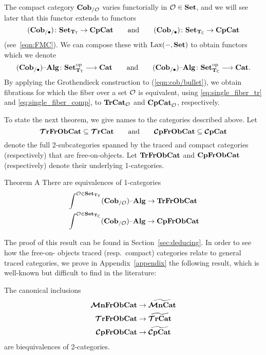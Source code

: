 \documentclass[11pt,oneside,article]{memoir}
\begin{document}
The compact category $\mathbf{Cob}_{/\mathcal{O}}$ varies functorially in $\mathcal{O}\in\mathbf{Set}$, and we will see later
that this functor extends to functors
\[
   (\mathbf{Cob}_{/\bullet})\colon\mathbf{Set}_{\mathbf{T}_{\mathsf{T}}}\to\mathbf{CpCat}\qquad\text{and}
   \qquad
   (\mathbf{Cob}_{/\bullet})\colon\mathbf{Set}_{\mathbf{T}_{\mathsf{C}}}\to\mathbf{CpCat}
\]
(see~\eqref{eqn:FMC}). We can compose these with $\operatorname{Lax}(-,\mathbf{Set})$ to obtain functors which we denote
\begin{equation}
      \label{eqn:cob/bullet}
   (\mathbf{Cob}_{/\bullet}){\text \textendash}\mathbf{Alg}\colon\mathbf{Set}_{\mathbf{T}_{\mathsf{T}}}^{\mathrm{op}}\longrightarrow\mathbf{Cat}
   \qquad\text{and}\qquad
   (\mathbf{Cob}_{/\bullet}){\text \textendash}\mathbf{Alg}\colon\mathbf{Set}_{\mathbf{T}_{\mathsf{C}}}^{\mathrm{op}}\longrightarrow\mathbf{Cat}.
\end{equation}
By applying the Grothendieck construction to (\ref{eqn:cob/bullet}), we obtain fibrations for which
the fiber over a set $\mathcal{O}$ is equivalent, using \eqref{eq:single_fiber_tr} and
\eqref{eq:single_fiber_comp}, to $\mathbf{TrCat}_{\mathcal{O}}$ and $\mathbf{CpCat}_{\mathcal{O}}$, respectively.

To state the next theorem, we give names to the categories described above. Let
\[
   \bm{\mathcal{T}}\mathbf{rFrObCat}\subseteq\bm{\mathcal{T}}\mathbf{rCat} \qquad \text{and} \qquad \bm{\mathcal{C}}\mathbf{pFrObCat}\subseteq\bm{\mathcal{C}}\mathbf{pCat}
\]
denote the full 2-subcategories spanned by the traced and compact categories (respectively) that are
free-on-objects. Let $\mathbf{TrFrObCat}$ and $\mathbf{CpFrObCat}$ (respectively) denote their underlying
1-categories.

\begin{named}{Theorem A}
      \label{thm:TheoremA_statement}
  There are equivalences of 1-categories
  \begin{align*}
     &\int^{\mathcal{O}\in\mathbf{Set}_{\mathbf{T}_{\mathsf{T}}}}(\mathbf{Cob}_{/\mathcal{O}}){\text \textendash}\mathbf{Alg} \to \mathbf{TrFrObCat}
     \\
     &\int^{\mathcal{O}\in\mathbf{Set}_{\mathbf{T}_{\mathsf{C}}}}(\mathbf{Cob}_{/\mathcal{O}}){\text \textendash}\mathbf{Alg} \to \mathbf{CpFrObCat}
  \end{align*}
\end{named}

The proof of this result can be found in Section~\ref{sec:deducing}. In order to see how the
free-on- objects traced (resp.\ compact) categories relate to general traced categories, we prove in
Appendix~\ref{appendix} the following result, which is well-known but difficult to find in the
literature:

\begin{corollary*}[\ref{cor:object_frees}]
   The canonical inclusions
   \begin{align*}
      \bm{\mathcal{M}}\mathbf{nFrObCat} &\to \widetilde{\bm{\mathcal{M}}\mathbf{nCat}} \\
      \bm{\mathcal{T}}\mathbf{rFrObCat} &\to \widetilde{\bm{\mathcal{T}}\mathbf{rCat}} \\
      \bm{\mathcal{C}}\mathbf{pFrObCat} &\to \widetilde{\bm{\mathcal{C}}\mathbf{pCat}}
   \end{align*}
   are biequivalences of 2-categories.
\end{corollary*}
\end{document}
